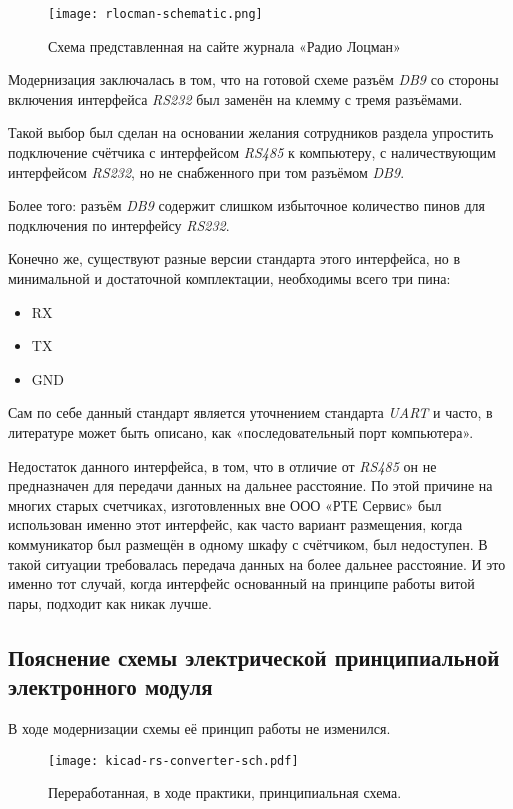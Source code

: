 \begin{figure}[H]
  \centering
  \texttt{[image: rlocman-schematic.png]}
  \caption{Схема представленная на сайте журнала «Радио Лоцман»}
\end{figure}

Модернизация заключалась в том,
что на готовой схеме разъём \textit{DB9}
со стороны включения интерфейса \textit{RS232}
был заменён на клемму с тремя разъёмами.

Такой выбор был сделан на основании
желания сотрудников раздела
упростить подключение счётчика с интерфейсом \textit{RS485}
к компьютеру, с наличествующим интерфейсом \textit{RS232},
но не снабженного при том разъёмом \textit{DB9}.

Более того: разъём \textit{DB9}
содержит слишком избыточное количество
пинов для подключения по интерфейсу \textit{RS232}.

Конечно же, существуют разные версии стандарта этого интерфейса,
но в минимальной и достаточной комплектации,
необходимы всего три пина:
\begin{itemize}
\item RX
\item TX
\item GND
\end{itemize}

Сам по себе данный стандарт является уточнением
стандарта \textit{UART} и часто,
в литературе может быть описано, как
«последовательный порт компьютера».

Недостаток данного интерфейса, в том,
что в отличие от \textit{RS485}
он не предназначен для передачи данных на дальнее расстояние.
По этой причине на многих старых счетчиках,
изготовленных вне ООО «РТЕ Сервис» был
использован именно этот интерфейс,
как часто вариант размещения,
когда коммуникатор был размещён в одному шкафу с счётчиком,
был недоступен.
В такой ситуации требовалась передача данных на более дальнее расстояние.
И это именно тот случай, когда интерфейс
основанный на принципе работы витой пары,
подходит как никак лучше.


\subsection{Пояснение схемы электрической принципиальной\\
  электронного модуля}

В ходе модернизации схемы её принцип работы не изменился.

\begin{figure}[H]
  \centering
  \texttt{[image: kicad-rs-converter-sch.pdf]}
  \caption{Переработанная, в ходе практики, принципиальная схема.}
\end{figure}

